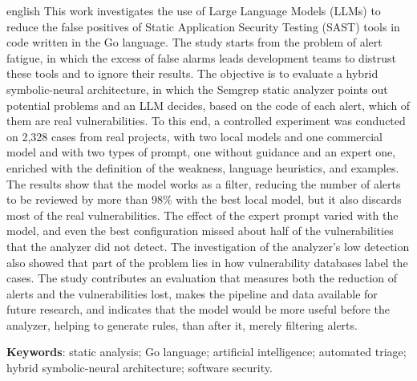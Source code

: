 \begin{resumo}[Abstract]
 \begin{otherlanguage*}{english}
    This work investigates the use of Large Language Models (LLMs) to reduce the false positives of Static Application Security Testing (SAST) tools in code written in the Go language. The study starts from the problem of alert fatigue, in which the excess of false alarms leads development teams to distrust these tools and to ignore their results. The objective is to evaluate a hybrid symbolic-neural architecture, in which the Semgrep static analyzer points out potential problems and an LLM decides, based on the code of each alert, which of them are real vulnerabilities. To this end, a controlled experiment was conducted on 2,328 cases from real projects, with two local models and one commercial model and with two types of prompt, one without guidance and an expert one, enriched with the definition of the weakness, language heuristics, and examples. The results show that the model works as a filter, reducing the number of alerts to be reviewed by more than 98\% with the best local model, but it also discards most of the real vulnerabilities. The effect of the expert prompt varied with the model, and even the best configuration missed about half of the vulnerabilities that the analyzer did not detect. The investigation of the analyzer's low detection also showed that part of the problem lies in how vulnerability databases label the cases. The study contributes an evaluation that measures both the reduction of alerts and the vulnerabilities lost, makes the pipeline and data available for future research, and indicates that the model would be more useful before the analyzer, helping to generate rules, than after it, merely filtering alerts.

   \vspace{\onelineskip}
 
   \noindent 
   \textbf{Keywords}: static analysis; Go language; artificial intelligence; automated triage; hybrid symbolic-neural architecture; software security.
 \end{otherlanguage*}
\end{resumo}